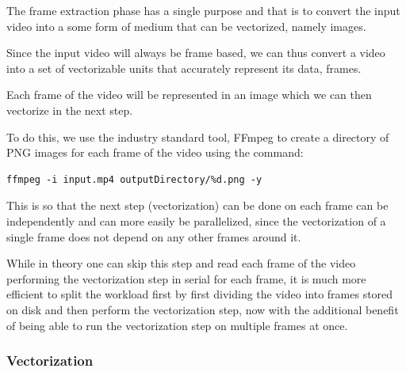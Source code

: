\documentclass[12pt]{article}
\newcommand{\sentence}{} %
\begin{document}
    \tab
    The frame extraction phase has a single purpose and that is to convert the input video into a some form of medium
    that can be vectorized, namely images.
    \sentence
    Since the input video will always be frame based, we can thus convert a video into a set of vectorizable units
    that accurately represent its data, frames.
    \sentence
    Each frame of the video will be represented in an image which we can then vectorize in the next step.
    \sentence
    To do this, we use the industry standard tool, FFmpeg to create a directory of PNG images for each frame of the
    video using the command:
    \begin{verbatim}ffmpeg -i input.mp4 outputDirectory/%d.png -y
    \end{verbatim}
    \sentence
    This is so that the next step (vectorization) can be done on each frame can be independently and can more easily
    be parallelized, since the vectorization of a single frame does not depend on any other frames around it.
    \sentence
    While in theory one can skip this step and read each frame of the video performing the vectorization step in
    serial for each frame, it is much more efficient to split the workload first by first dividing the video into
    frames stored on disk and then perform the vectorization step, now with the additional benefit of being able to
    run the vectorization step on multiple frames at once.


    \subsubsection{Vectorization}\label{subsubsec:vectorization}
\end{document}
